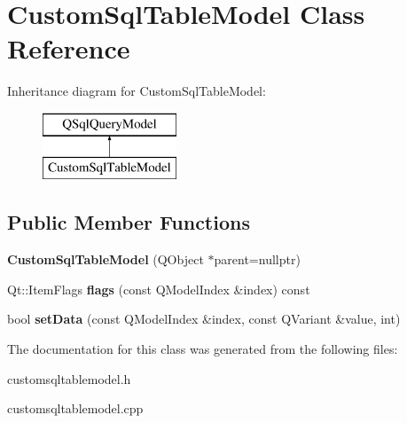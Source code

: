 \hypertarget{class_custom_sql_table_model}{}\section{Custom\+Sql\+Table\+Model Class Reference}
\label{class_custom_sql_table_model}
Inheritance diagram for Custom\+Sql\+Table\+Model\+:\begin{figure}[H]
\begin{center}
\leavevmode
\includegraphics[height=2.000000cm]{class_custom_sql_table_model}
\end{center}
\end{figure}
\subsection*{Public Member Functions}
\begin{DoxyCompactItemize}
\item 
\mbox{\label{class_custom_sql_table_model_a075e9fa54b6c339eedbc893c8c048ab0}} 
{\bfseries Custom\+Sql\+Table\+Model} (Q\+Object $\ast$parent=nullptr)
\item 
\mbox{\label{class_custom_sql_table_model_abff2c44cf6c27ee0a602b753a9f74c1b}} 
Qt\+::\+Item\+Flags {\bfseries flags} (const Q\+Model\+Index \&index) const
\item 
\mbox{\label{class_custom_sql_table_model_ab6ea7405d3235fa32e223b7d8295c00d}} 
bool {\bfseries set\+Data} (const Q\+Model\+Index \&index, const Q\+Variant \&value, int)
\end{DoxyCompactItemize}


The documentation for this class was generated from the following files\+:\begin{DoxyCompactItemize}
\item 
customsqltablemodel.\+h\item 
customsqltablemodel.\+cpp\end{DoxyCompactItemize}
